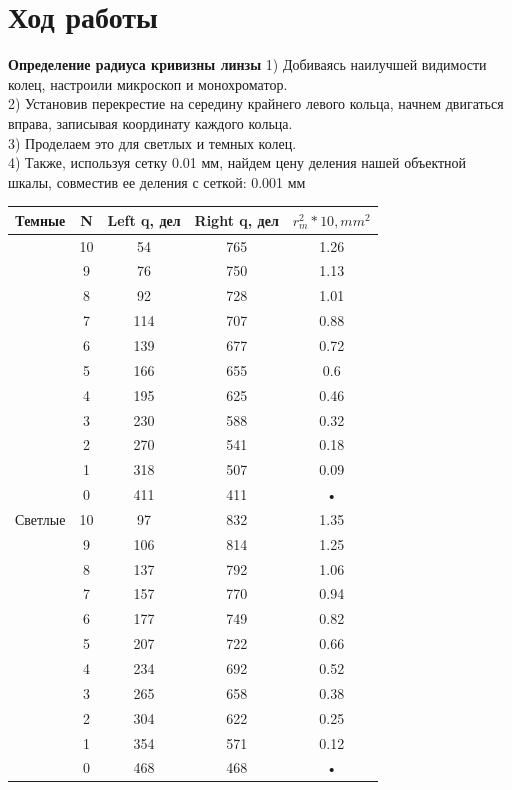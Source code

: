 \documentclass[a4paper,12pt]{article} %
\begin{document}
\section{Ход работы}

\textbf{Определение радиуса кривизны линзы}
1) Добиваясь наилучшей видимости колец, настроили микроскоп и монохроматор.\\
2) Установив перекрестие на середину крайнего левого кольца, начнем двигаться вправа, записывая координату каждого кольца. \\
3) Проделаем это для светлых и темных колец.\\
4) Также, используя сетку 0.01 мм, найдем цену деления нашей объектной шкалы, совместив ее деления с сеткой: 0.001 мм \\
\begin{tabular}{|c|c|c|c|c|}
\hline 
Темные & N & Left q, дел & Right q, дел & $r_{m} ^2*10, mm^2$ \\ 
\hline 
 & 10 & 54 & 765 & 1.26 \\ 
\hline 
 & 9 & 76 & 750 & 1.13 \\ 
\hline 
 & 8 & 92 & 728 & 1.01 \\ 
\hline 
 & 7 & 114 & 707 & 0.88 \\ 
\hline 
 & 6 & 139 & 677 & 0.72 \\ 
\hline 
 & 5 & 166 & 655 & 0.6 \\ 
\hline 
 & 4 & 195 & 625 & 0.46 \\ 
\hline 
 & 3 & 230 & 588 & 0.32 \\ 
\hline 
 & 2 & 270 & 541 & 0.18 \\ 
\hline 
 & 1 & 318 & 507 & 0.09 \\ 
\hline 
 & 0 & 411 & 411 & • \\ 
\hline 
Светлые & 10 & 97 & 832 & 1.35 \\ 
\hline 
 & 9 & 106 & 814 & 1.25 \\ 
\hline 
 & 8 & 137 & 792 & 1.06 \\ 
\hline 
 & 7 & 157 & 770 & 0.94 \\ 
\hline 
 & 6 & 177 & 749 & 0.82 \\ 
\hline 
 & 5 & 207 & 722 & 0.66 \\ 
\hline 
 & 4 & 234 & 692 & 0.52 \\ 
\hline 
 & 3 & 265 & 658 & 0.38 \\ 
\hline 
 & 2 & 304 & 622 & 0.25 \\ 
\hline 
 & 1 & 354 & 571 & 0.12 \\ 
\hline 
 & 0 & 468 & 468 & • \\ 
\hline 
\end{tabular} 
        
\end{document}
